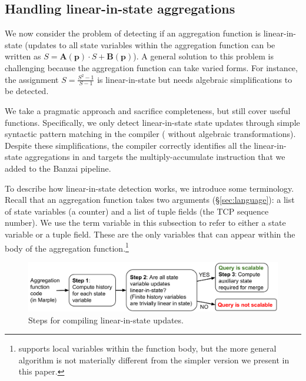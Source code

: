 \subsection{Handling linear-in-state aggregations}
\label{sec:linear-in-state-compilation}

We now consider the problem of detecting if an aggregation function is
linear-in-state (\ie updates to all state variables within the aggregation
function can be written as
$S = \boldsymbol{A}(\mathbf{p}) \cdot S + \boldsymbol{B}(\mathbf{p})$).
A general solution to
this problem is challenging because the aggregation function can take varied
forms. For instance, the assignment $S = \frac{S^2 - 1}{S -1}$ is
linear-in-state but needs algebraic simplifications to be detected.

We take a pragmatic approach and sacrifice completeness, but still cover useful
functions. Specifically, we only detect linear-in-state state updates through
simple syntactic pattern matching in the compiler (\ie 
without algebraic transformations).  Despite these simplifications, the \TheSystem
compiler correctly identifies all the linear-in-state aggregations in
 and targets the multiply-accumulate
instruction that we added to the Banzai pipeline.

To describe how linear-in-state detection works, we introduce some
terminology.  Recall that an aggregation function takes two arguments
(\S\ref{sec:language}): a list of state variables (\eg a counter) and a list of
tuple fields (\eg the TCP sequence number). We use the term variable in this
subsection to refer to either a state variable or a tuple field. These are the only variables that can appear within the body
of the aggregation function.\footnote{\TheSystem supports local variables within
  the function body, but the more general algorithm is not materially
  different from the simpler version we present in this paper.}

\begin{figure}
\centering
\includegraphics[width=\columnwidth]{pq_compiler-steps.pdf}
\caption{Steps for compiling linear-in-state updates.}
\label{fig:compiler-steps}
\end{figure}

